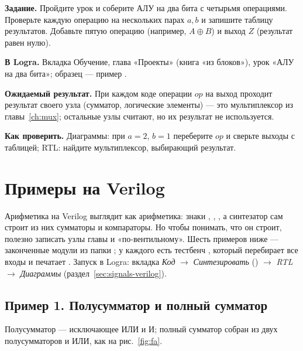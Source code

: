 \begin{diybox}
\textbf{Задание.}  Пройдите урок и соберите АЛУ на два бита с
четырьмя операциями.  Проверьте каждую операцию на нескольких парах
$a,b$ и запишите таблицу результатов.  Добавьте пятую операцию
(например, $A\oplus B$) и выход $Z$ (результат равен нулю).

\textbf{В Logra.} Вкладка Обучение, глава «Проекты» (книга «из блоков»), урок
«АЛУ на два бита»; образец --- пример .

\textbf{Ожидаемый результат.} При каждом коде операции $op$ на выход проходит
результат своего узла (сумматор, логические элементы) --- это мультиплексор из
главы~\ref{ch:mux}; остальные узлы считают, но их результат не используется.

\textbf{Как проверить.} Диаграммы: при $a=2$, $b=1$ переберите $op$ и сверьте
выходы с таблицей; RTL: найдите мультиплексор, выбирающий результат.
\end{diybox}

\section{Примеры на Verilog}
\label{sec:arith-verilog}

Арифметика на Verilog выглядит как арифметика: знаки \code{+}, \code{-},
\code{>}, а синтезатор сам строит из них сумматоры и компараторы. Но чтобы
понимать, что он строит, полезно записать узлы главы и «по-вентильному».
Шесть примеров ниже --- законченные модули из папки ;
у каждого есть тестбенч , который перебирает все входы и
печатает . Запуск в Logra: вкладка \emph{Код} $\to$
\emph{Синтезировать} () $\to$ \emph{RTL} $\to$
\emph{Диаграммы} (раздел~\ref{sec:signals-verilog}).

\subsection{Пример 1. Полусумматор и полный сумматор}

Полусумматор --- исключающее ИЛИ и И; полный сумматор собран из двух
полусумматоров и ИЛИ, как на рис.~\ref{fig:fa}.


